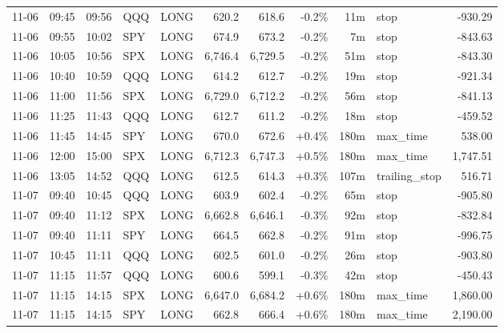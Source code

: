 \documentclass[11pt,a4paper,twoside]{article}
\begin{document}
\begin{center}
\begin{longtable}{>{\color{txtmain}}l l l l l r r r r >{\color{txtmain}}l r}
11-06 & 09:45 & 09:56 & QQQ & LONG & 620.2 & 618.6 & \textcolor{lossred}{-0.2\%} & 11m & stop & \textcolor{lossred}{-930.29} \\
11-06 & 09:55 & 10:02 & SPY & LONG & 674.9 & 673.2 & \textcolor{lossred}{-0.2\%} & 7m & stop & \textcolor{lossred}{-843.63} \\
11-06 & 10:05 & 10:56 & SPX & LONG & 6,746.4 & 6,729.5 & \textcolor{lossred}{-0.2\%} & 51m & stop & \textcolor{lossred}{-843.30} \\
11-06 & 10:40 & 10:59 & QQQ & LONG & 614.2 & 612.7 & \textcolor{lossred}{-0.2\%} & 19m & stop & \textcolor{lossred}{-921.34} \\
11-06 & 11:00 & 11:56 & SPX & LONG & 6,729.0 & 6,712.2 & \textcolor{lossred}{-0.2\%} & 56m & stop & \textcolor{lossred}{-841.13} \\
11-06 & 11:25 & 11:43 & QQQ & LONG & 612.7 & 611.2 & \textcolor{lossred}{-0.2\%} & 18m & stop & \textcolor{lossred}{-459.52} \\
11-06 & 11:45 & 14:45 & SPY & LONG & 670.0 & 672.6 & \textcolor{wingreen}{+0.4\%} & 180m & max\_time & \textcolor{wingreen}{538.00} \\
11-06 & 12:00 & 15:00 & SPX & LONG & 6,712.3 & 6,747.3 & \textcolor{wingreen}{+0.5\%} & 180m & max\_time & \textcolor{wingreen}{1,747.51} \\
11-06 & 13:05 & 14:52 & QQQ & LONG & 612.5 & 614.3 & \textcolor{wingreen}{+0.3\%} & 107m & trailing\_stop & \textcolor{wingreen}{516.71} \\
11-07 & 09:40 & 10:45 & QQQ & LONG & 603.9 & 602.4 & \textcolor{lossred}{-0.2\%} & 65m & stop & \textcolor{lossred}{-905.80} \\
11-07 & 09:40 & 11:12 & SPX & LONG & 6,662.8 & 6,646.1 & \textcolor{lossred}{-0.3\%} & 92m & stop & \textcolor{lossred}{-832.84} \\
11-07 & 09:40 & 11:11 & SPY & LONG & 664.5 & 662.8 & \textcolor{lossred}{-0.2\%} & 91m & stop & \textcolor{lossred}{-996.75} \\
11-07 & 10:45 & 11:11 & QQQ & LONG & 602.5 & 601.0 & \textcolor{lossred}{-0.2\%} & 26m & stop & \textcolor{lossred}{-903.80} \\
11-07 & 11:15 & 11:57 & QQQ & LONG & 600.6 & 599.1 & \textcolor{lossred}{-0.3\%} & 42m & stop & \textcolor{lossred}{-450.43} \\
11-07 & 11:15 & 14:15 & SPX & LONG & 6,647.0 & 6,684.2 & \textcolor{wingreen}{+0.6\%} & 180m & max\_time & \textcolor{wingreen}{1,860.00} \\
11-07 & 11:15 & 14:15 & SPY & LONG & 662.8 & 666.4 & \textcolor{wingreen}{+0.6\%} & 180m & max\_time & \textcolor{wingreen}{2,190.00} \\

\end{longtable}
\end{center}
\end{document}
